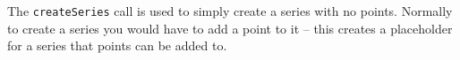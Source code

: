 The \verb+createSeries+ call is used to simply create a series with no points. Normally to create
a series you would have to add a point to it -- this creates a placeholder for a series that points
can be added to.
